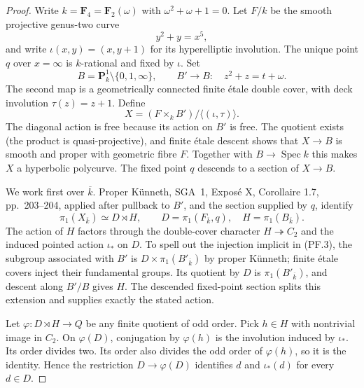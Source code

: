 \documentclass[11pt,a4paper]{article}
\theoremstyle{definition}
\begin{document}
\begin{proof}
Write $k=\mathbf F_4=\mathbf F_2(\omega)$ with
$\omega^2+\omega+1=0$. Let $F/k$ be the smooth projective
genus-two curve
\[
 y^2+y=x^5,
\]
and write $\iota(x,y)=(x,y+1)$ for its hyperelliptic
involution. The unique point $q$ over $x=\infty$ is $k$-rational
and fixed by $\iota$. Set
\[
 B=\mathbf P^1_k\setminus\{0,1,\infty\},\qquad
 B'\longrightarrow B:\quad z^2+z=t+\omega.
                                                               \tag{PF.1}
\]
The second map is a geometrically connected finite \'etale
double cover, with deck involution $\tau(z)=z+1$.
Define
\[
 X=(F\times_k B')/\langle(\iota,\tau)\rangle.
                                                               \tag{PF.2}
\]
The diagonal action is free because its action on $B'$ is free.
The quotient exists (the product is quasi-projective), and finite
\'etale descent shows that $X\to B$ is smooth and proper with
geometric fibre $F$. Together with $B\to\operatorname{Spec}k$
this makes $X$ a hyperbolic polycurve. The fixed point $q$ descends
to a section of $X\to B$.

We work first over $\overline k$. Proper K\"unneth, SGA~1,
Expos\'e X, Corollaire 1.7, pp.~203--204, applied after pullback
to $B'$, and the section supplied by $q$, identify
\[
 \pi_1(X_{\overline k})\simeq
 D\rtimes H,\qquad
 D=\pi_1(F_{\overline k},q),\quad H=\pi_1(B_{\overline k}).
                                                               \tag{PF.3}
\]
The action of $H$ factors through the double-cover character
$H\twoheadrightarrow C_2$ and the induced pointed action
$\iota_*$ on $D$. To spell out the injection implicit in
(PF.3), the subgroup associated with $B'$ is
$D\times\pi_1(B'_{\overline k})$ by proper K\"unneth;
finite \'etale covers inject their fundamental groups. Its
quotient by $D$ is $\pi_1(B'_{\overline k})$, and descent along
$B'/B$ gives $H$. The descended fixed-point section splits this
extension and supplies exactly the stated action.

Let $\varphi:D\rtimes H\to Q$ be any finite quotient of odd
order. Pick $h\in H$ with nontrivial image in $C_2$.
On $\varphi(D)$, conjugation by $\varphi(h)$ is the involution
induced by $\iota_*$. Its order divides two. Its order also
divides the odd order of $\varphi(h)$, so it is the identity.
Hence the restriction $D\to\varphi(D)$ identifies $d$ and
$\iota_*(d)$ for every $d\in D$.


\end{proof}
\end{document}
